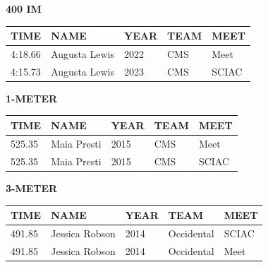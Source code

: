\begin{table}[H]
\centering
\begin{minipage}[t]{0.6\textwidth}
\centering
\textbf{400 IM}\\[0.1cm]
\begin{tabular}{@{}p{1.8cm}p{2.8cm}p{1.2cm}p{1.4cm}p{1.4cm}@{}}
\hline
    \textbf{TIME} & \textbf{NAME} & \textbf{YEAR} & \textbf{TEAM} & \textbf{MEET} \\
\hline
    4:18.66 & Augusta Lewis & 2022 & CMS & Meet \\
    4:15.73 & Augusta Lewis & 2023 & CMS & SCIAC \\
\hline
\end{tabular}
\end{minipage}
\end{table}

\begin{table}[H]
\centering
\begin{minipage}[t]{0.6\textwidth}
\centering
\textbf{1-METER}\\[0.1cm]
\begin{tabular}{@{}p{1.8cm}p{2.8cm}p{1.2cm}p{1.4cm}p{1.4cm}@{}}
\hline
    \textbf{TIME} & \textbf{NAME} & \textbf{YEAR} & \textbf{TEAM} & \textbf{MEET} \\
\hline
    525.35 & Maia Presti & 2015 & CMS & Meet \\
    525.35 & Maia Presti & 2015 & CMS & SCIAC \\
\hline
\end{tabular}
\end{minipage}
\end{table}

\begin{table}[H]
\centering
\begin{minipage}[t]{0.6\textwidth}
\centering
\textbf{3-METER}\\[0.1cm]
\begin{tabular}{@{}p{1.8cm}p{2.8cm}p{1.2cm}p{1.4cm}p{1.4cm}@{}}
\hline
    \textbf{TIME} & \textbf{NAME} & \textbf{YEAR} & \textbf{TEAM} & \textbf{MEET} \\
\hline
    491.85 & Jessica Robson & 2014 & Occidental & SCIAC \\
    491.85 & Jessica Robson & 2014 & Occidental & Meet \\
\hline
\end{tabular}
\end{minipage}
\end{table}

